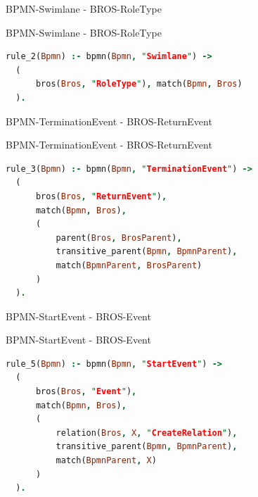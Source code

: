 \begin{frame}{BPMN-Swimlane - BROS-RoleType}
  \begin{figure}
    \centering
    \begin{adjustbox}{width=0.5\linewidth,center}
      
    \end{adjustbox}
  \end{figure}
\end{frame}
\begin{frame}[fragile]{BPMN-Swimlane - BROS-RoleType}
\begin{lstlisting}[language=Prolog]
rule_2(Bpmn) :- bpmn(Bpmn, "Swimlane") ->
  (
      bros(Bros, "RoleType"), match(Bpmn, Bros)
  ).
\end{lstlisting}
\end{frame}
\begin{frame}{BPMN-TerminationEvent - BROS-ReturnEvent}
  \begin{figure}
    \centering
    \begin{adjustbox}{width=0.5\linewidth,center}
      
    \end{adjustbox}
  \end{figure}
\end{frame}
\begin{frame}[fragile]{BPMN-TerminationEvent - BROS-ReturnEvent}
\begin{lstlisting}[language=Prolog]
rule_3(Bpmn) :- bpmn(Bpmn, "TerminationEvent") ->
  (
      bros(Bros, "ReturnEvent"), 
      match(Bpmn, Bros),
      (
          parent(Bros, BrosParent),
          transitive_parent(Bpmn, BpmnParent),
          match(BpmnParent, BrosParent)
      )
  ).
\end{lstlisting}
\end{frame}
\begin{frame}{BPMN-StartEvent - BROS-Event}
  \begin{figure}
    \centering
    \begin{adjustbox}{width=0.5\linewidth,center}
      
    \end{adjustbox}
  \end{figure}
\end{frame}
\begin{frame}[fragile]{BPMN-StartEvent - BROS-Event}
\begin{lstlisting}[language=Prolog]
rule_5(Bpmn) :- bpmn(Bpmn, "StartEvent") ->
  (
      bros(Bros, "Event"),
      match(Bpmn, Bros),
      (
          relation(Bros, X, "CreateRelation"),
          transitive_parent(Bpmn, BpmnParent),
          match(BpmnParent, X)
      )
  ).
\end{lstlisting}
\end{frame}